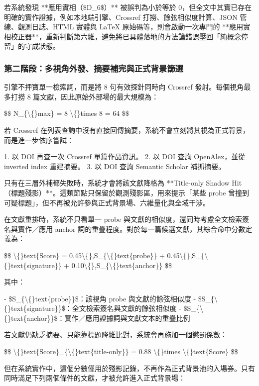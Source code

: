 \documentclass{article}
\begin{document}
若系統發現 **應用實相（\$D\_6\$）** 被誤判為小於等於 0，但全文中其實已存在明確的實作證據，例如本地端引擎、Crossref 打撈、餘弦相似度計算、JSON 管線、觀測日誌、HTML 實體與 LaTeX 原始碼等，則會啟動一次專門的 **應用實相校正器**，重新判斷第六維，避免將已具體落地的方法論錯誤壓回「純概念停留」的守成狀態。

\subsubsection{第二階段：多視角外發、摘要補完與正式背景篩選}

引擎不押寶單一檢索詞，而是將 8 句有效探針同時向 Crossref 發射。每個視角最多打撈 8 篇文獻，因此原始外部場的最大規模為：

\$\$
N\_\{\textbackslash\{\}max\} = 8 \textbackslash\{\}times 8 = 64
\$\$

若 Crossref 在列表查詢中沒有直接回傳摘要，系統不會立刻將其視為正式背景，而是進一步依序嘗試：

1. 以 DOI 再查一次 Crossref 單篇作品資訊。  
2. 以 DOI 查詢 OpenAlex，並從 inverted index 重建摘要。  
3. 以 DOI 查詢 Semantic Scholar 補抓摘要。  

只有在三層外補都失敗時，系統才會將該文獻降格為 **Title-only Shadow Hit（標題殘影）**。這類節點只保留於觀測殘影區，用來提示「某些 probe 曾撞到可疑標題」，但不再被允許參與正式背景場、六維量化與全域干涉。

在文獻重排時，系統不只看單一 probe 與文獻的相似度，還同時考慮全文檢索簽名與實作／應用 anchor 詞的重疊程度。對於每一篇候選文獻，其綜合命中分數定義為：

\$\$
\textbackslash\{\}text\{Score\} = 0.45\textbackslash\{\},S\_\{\textbackslash\{\}text\{probe\}\} + 0.45\textbackslash\{\},S\_\{\textbackslash\{\}text\{signature\}\} + 0.10\textbackslash\{\},S\_\{\textbackslash\{\}text\{anchor\}\}
\$\$

其中：

- \$S\_\{\textbackslash\{\}text\{probe\}\}\$：該視角 probe 與文獻的餘弦相似度  
- \$S\_\{\textbackslash\{\}text\{signature\}\}\$：全文檢索簽名與文獻的餘弦相似度  
- \$S\_\{\textbackslash\{\}text\{anchor\}\}\$：實作／應用證據詞與文獻文本的重疊比例  

若文獻仍缺乏摘要、只能靠標題降維比對，系統會再施加一個懲罰係數：

\$\$
\textbackslash\{\}text\{Score\}\_\{\textbackslash\{\}text\{title-only\}\} = 0.88 \textbackslash\{\}times \textbackslash\{\}text\{Score\}
\$\$

但在系統實作中，這個分數僅用於殘影記錄，不再作為正式背景池的入場券。只有同時滿足下列兩個條件的文獻，才被允許進入正式背景場：
\end{document}
